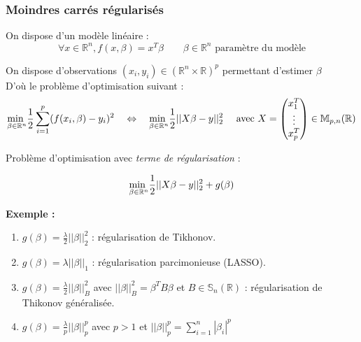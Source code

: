 \documentclass[12pt,a4paper]{article}
\begin{document}
\subsubsection{Moindres carrés régularisés}

On dispose d'un modèle linéaire :
$$
\forall x \in \mathbb{R}^n, f(x, \beta) = x^T \beta \quad \quad \beta \in \mathbb{R}^n \text{ paramètre du modèle}
$$

\noindent On dispose d'observations $(x_i, y_i) \in (\mathbb{R}^n \times \mathbb{R})^p$ permettant d'estimer $\beta$\\


\noindent D'où le problème d'optimisation suivant :\\
\begin{equation}
    \underset{\beta \in \mathbb{R}^n}{\text{min }} \frac{1}{2} \sum_{i=1}^p (f(x_i, \beta) - y_i)^2 \quad \Leftrightarrow \quad \underset{\beta \in \mathbb{R}^n}{\text{min }} \frac{1}{2} ||X\beta - y||_2^2 \quad \text{ avec } X = 
    \begin{pmatrix}
        x_1^T\\
        \vdots\\
        x_p^T
    \end{pmatrix}
    \in \mathbb{M}_{p,n}(\mathbb{R})\\
\end{equation}

\noindent Problème d'optimisation avec \textit{terme de régularisation} :

\begin{equation}
    \underset{\beta \in \mathbb{R}^n}{\text{min }} \frac{1}{2} ||X\beta - y||_2^2 + g(\beta)\\
\end{equation}

\newpage

\noindent\textbf{Exemple :}
\begin{enumerate}[label=\roman*)]
    \item $g(\beta) = \frac{\lambda}{2}||\beta||_2^2$ : régularisation de Tikhonov.
    \item $g(\beta) = \lambda ||\beta||_1$ : régularisation parcimonieuse (LASSO).
    \item $g(\beta) = \frac{\lambda}{2}||\beta||_B^2$ avec $||\beta||_B^2 = \beta^T B \beta$ et $B \in \mathbb{S}_n(\mathbb{R})$ : régularisation de Thikonov généralisée.
    \item $g(\beta) = \frac{\lambda}{p} ||\beta||_p^p$ avec $p > 1$  et $||\beta||_p^p = \sum_{i=1}^n |\beta_i|^p$
\end{enumerate}
\end{document}
